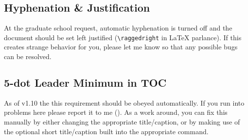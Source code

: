 \subsection{Hyphenation \& Justification}
At the graduate school request, automatic hyphenation is turned off and the document should be set left justified (\verb=\raggedright= in LaTeX parlance).  If this creates strange behavior for you, please let me know so that any possible bugs can be resolved.

\subsection{5-dot Leader Minimum in TOC}
As of v1.10 the this requirement should be obeyed automatically.  If you run into problems here please report it to me (\email).  As a work around, you can fix this manually by either changing the appropriate title/caption, or by making use of the optional short title/caption built into the appropriate command.

\endinput
